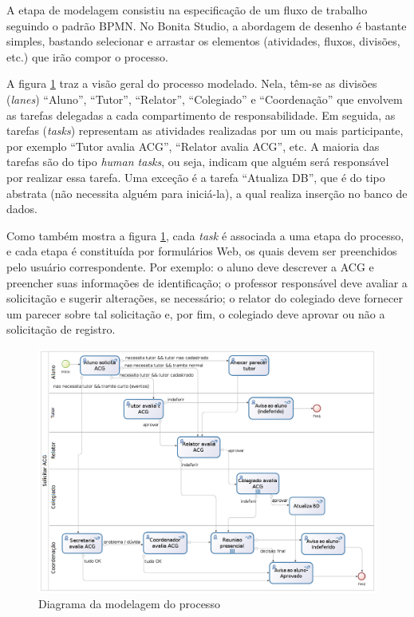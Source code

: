 \documentclass[12pt]{article}
\begin{document}
A etapa de modelagem consistiu na especificação de um fluxo de trabalho seguindo o padrão BPMN. No Bonita Studio, a abordagem de desenho é bastante simples, bastando selecionar e arrastar os elementos (atividades, fluxos, divisões, etc.) que irão compor o processo.

	A figura \ref{fig:diagrama} traz a visão geral do processo modelado. Nela, têm-se as divisões (\emph{lanes}) “Aluno”, “Tutor”, “Relator”, “Colegiado” e “Coordenação” que envolvem as tarefas delegadas a cada compartimento de responsabilidade. Em seguida, as tarefas  (\emph{tasks})  representam as atividades realizadas por um ou mais participante, por exemplo “Tutor avalia ACG”, “Relator avalia ACG”, etc. A maioria das tarefas são do tipo \emph{human tasks}, ou seja, indicam que alguém será responsável por realizar essa tarefa. Uma exceção é a tarefa “Atualiza DB”, que é do tipo abstrata (não necessita alguém para iniciá-la), a qual realiza inserção no banco de dados.

Como também mostra a figura \ref{fig:diagrama}, cada \emph{task}  é associada a uma etapa do processo, e cada etapa é constituída  por formulários Web, os quais devem ser preenchidos pelo usuário correspondente. Por exemplo: o aluno deve  descrever  a ACG e preencher  suas  informações  de  identificação;  o professor responsável deve avaliar a solicitação e sugerir alterações, se necessário; o relator do colegiado deve fornecer um parecer sobre tal solicitação e, por fim, o colegiado deve aprovar ou não a solicitação de registro.

\begin{figure}[ht]
\centering
\includegraphics[width=.99\textwidth]{images/processo.png}
\caption{Diagrama da modelagem do processo}
\label{fig:diagrama}
\end{figure}
\end{document}
